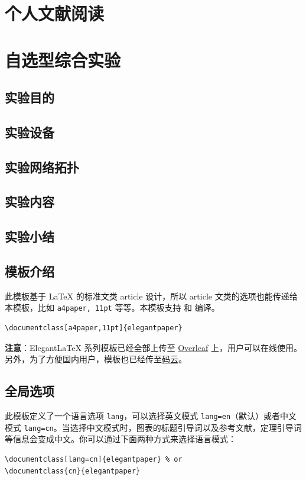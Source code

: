 \documentclass[lang=cn,11pt,a4paper,cite=authoryear]{elegantpaper}
\begin{document}
\section{个人文献阅读}
\section{自选型综合实验}
\subsection{实验目的}
\subsection{实验设备}
\subsection{实验网络拓扑}
\subsection{实验内容}
\subsection{实验小结}

\subsection{模板介绍}

此模板基于 \LaTeX{} 的标准文类 article 设计，所以 article 文类的选项也能传递给本模板，比如 \lstinline{a4paper, 11pt} 等等。本模板支持  和  编译。

\begin{lstlisting}
\documentclass[a4paper,11pt]{elegantpaper}
\end{lstlisting}

\textbf{注意}：Elegant\LaTeX{} 系列模板已经全部上传至 \href{https://www.overleaf.com/latex/templates/elegantpaper-template/yzghrqjhmmmr}{Overleaf} 上，用户可以在线使用。另外，为了方便国内用户，模板也已经传至\href{https://gitee.com/ElegantLaTeX/ElegantPaper}{码云}。


\subsection{全局选项}
此模板定义了一个语言选项 \lstinline{lang}，可以选择英文模式 \lstinline{lang=en}（默认）或者中文模式 \lstinline{lang=cn}。当选择中文模式时，图表的标题引导词以及参考文献，定理引导词等信息会变成中文。你可以通过下面两种方式来选择语言模式：
\begin{lstlisting}
\documentclass[lang=cn]{elegantpaper} % or
\documentclass{cn}{elegantpaper} 
\end{lstlisting}
\end{document}
